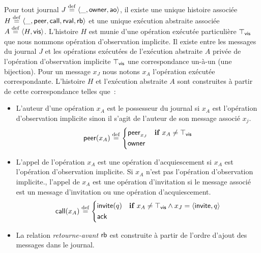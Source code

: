 \begin{definition}\label{def:exec-abs-log}
Pour tout journal $J \defeq \tuple*{\_, \trm{owner}, \trm{ao}}$, il existe une unique histoire associée $H \defeq \tuple*{\_, \trm{peer}, \trm{call}, \trm{rval}, \trm{rb}}$ et une unique exécution abstraite associée $A \defeq \tuple*{H, \trm{vis}}$.
L'histoire $H$ est munie d'une opération exécutée particulière $\top_{\trm{vis}}$ que nous nommons opération d'observation implicite.
Il existe entre les messages du journal $J$ et les opérations exécutées de l'exécution abstraite $A$ privée de l'opération d'observation implicite $\top_{\trm{vis}}$ une correspondance un-à-un (une bijection).
Pour un message $x_J$ nous notons $x_A$ l'opération exécutée correspondante.
L'histoire $H$ et l'exécution abstraite $A$ sont construites à partir de cette correspondance telles que~:
\begin{itemize}
\item L'auteur d'une opération $x_A$ est le possesseur du journal si $x_A$ est l'opération d'observation implicite sinon il s'agit de l'auteur de son message associé $x_j$.
\begin{equation*}
    \trm{peer}(x_A) \defeq \begin{dcases}
        \trm{peer}_{x_J} & \when x_A \neq \top_{\trm{vis}}\\
        \trm{owner} &
    \end{dcases}
\end{equation*}
\item L'appel de l'opération $x_A$ est une opération d'acquiescement si $x_A$ est l'opération d'observation implicite.
Si $x_A$ n'est pas l'opération d'observation implicite., l'appel de $x_A$ est une opération d'invitation si le message associé est un message d'invitation ou une opération d'acquiescement.
\begin{equation*}
    \trm{call}(x_A) \defeq \begin{dcases}
        \trm{invite}(q) & \when x_A \neq \top_{\trm{vis}} \land x_J = \tuple*{\trm{invite}, q}\\
        \trm{ack} &
    \end{dcases}
\end{equation*}
\item La relation \emph{retourne-avant} $\trm{rb}$ est construite à partir de l'ordre d'ajout des messages dans le journal.

\end{itemize}
\end{definition}
